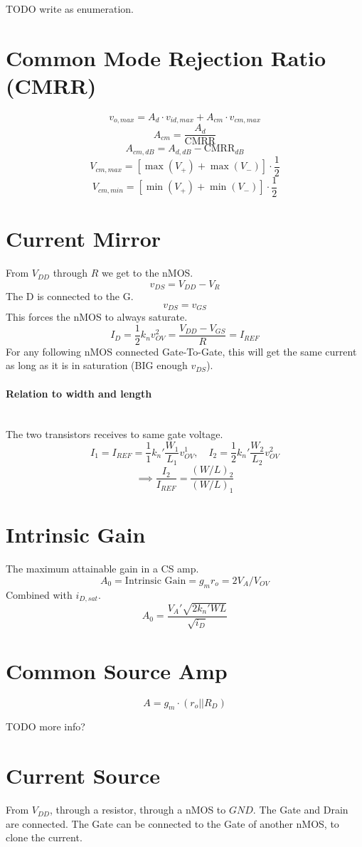 \documentclass[twocolumn]{article}
\begin{document}
      TODO write as enumeration.
  \section{Common Mode Rejection Ratio (CMRR)}
    $$v_{o,max} = A_d \cdot v_{id,max} + A_{cm} \cdot v_{cm,max}$$
    $$A_{cm} = \frac{A_d}{\text{CMRR}}$$
    $$A_{cm,dB} = A_{d,dB} - \text{CMRR}_{dB}$$
    $$V_{cm,max} = \left[\max(V_+) + \max(V_-) \right] \cdot \frac{1}{2}$$
    $$V_{cm,min} = \left[\min(V_+) + \min(V_-) \right] \cdot \frac{1}{2}$$
  \section{Current Mirror}
    From $V_{DD}$ through $R$ we get to the nMOS.
    $$v_{DS} = V_{DD} - V_R$$
    The D is connected to the G.
    $$v_{DS} = v_{GS}$$
    This forces the nMOS to always saturate.
    $$I_D = \frac{1}{2} k_n v_{OV}^2 = \frac{V_{DD} - V_{GS}}{R} = I_{REF}$$
    For any following nMOS connected Gate-To-Gate, this will get the same
    current as long as it is in saturation (BIG enough $v_{DS}$).

    \paragraph{Relation to width and length} \hfill \\
    The two transistors receives to same gate voltage.
    $$I_1 = I_{REF} = \frac{1}{1} k_n' \frac{W_1}{L_1} v_{OV}^1
      ,\quad
      I_2 = \frac{1}{2} k_n' \frac{W_2}{L_2} v_{OV}^2
      $$
    $$\implies \frac{I_2}{I_{REF}} = \frac{(W/L)_2}{(W/L)_1}$$
  \section{Intrinsic Gain}
    The maximum attainable gain in a CS amp.
    $$A_0 = \text{Intrinsic Gain} = g_m r_o = 2V_A / V_{OV}$$
    Combined with $i_{D,sat}$.
    $$A_0 = \frac{V_A' \sqrt{2 k_n' WL}}{\sqrt{i_D}}$$
  \section{Common Source Amp}
    $$A = g_m \cdot (r_o || R_D)$$

    TODO more info?
  \section{Current Source}
    From $V_{DD}$, through a resistor, through a nMOS to $GND$.
    The Gate and Drain are connected.
    The Gate can be connected to the Gate of another nMOS, to clone the current.
\end{document}
